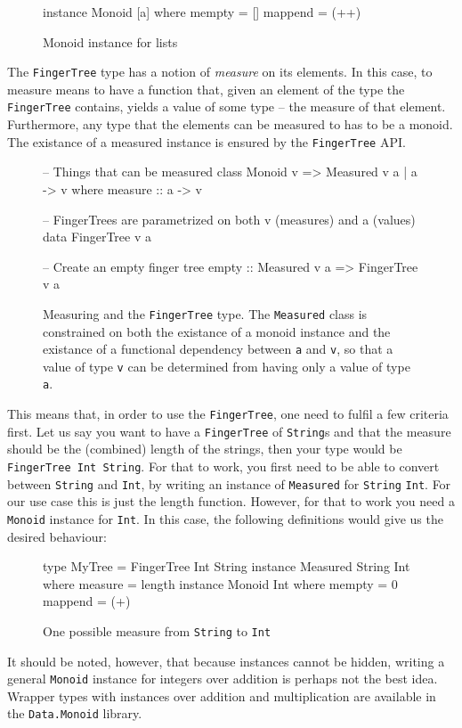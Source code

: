 \documentclass[a4paper,12pt,twosided]{report}
\begin{document}
\begin{figure}[H]
\begin{code}
instance Monoid [a] where
    mempty = []
    mappend = (++)
\end{code}
\caption{Monoid instance for lists}
\end{figure}

The \texttt{FingerTree} type has a notion of \textit{measure} on its elements.
In this case, to measure means to have a function that, given an element of the
type the \texttt{FingerTree} contains, yields a value of some type -- the
measure of that element. Furthermore, any type that the elements can be measured
to has to be a monoid. The existance of a measured instance is ensured by the
\texttt{FingerTree} API. 

\begin{figure}[H]
\begin{code}
-- Things that can be measured
class Monoid v => Measured v a | a -> v where
    measure :: a -> v

-- FingerTrees are parametrized on both v (measures) and a (values)
data FingerTree v a

-- Create an empty finger tree
empty :: Measured v a => FingerTree v a
\end{code}
\caption{Measuring and the \texttt{FingerTree} type. The \texttt{Measured} class
is constrained on both the existance of a monoid instance and the existance of a
functional dependency between \texttt{a} and \texttt{v}, so that a value of type
\texttt{v} can be determined from having only a value of type \texttt{a}.}
\end{figure}

This means that, in order to use the \texttt{FingerTree}, one need to fulfil a
few criteria first. Let us say you want to have a \texttt{FingerTree} of
\texttt{String}s and that the measure should be the (combined) length of the
strings, then your type would be \texttt{FingerTree Int String}. For that to
work, you first need to be able to convert between \texttt{String} and
\texttt{Int}, by writing an instance of \texttt{Measured} for \texttt{String}
\texttt{Int}. For our use case this is just the length function. However, for that to
work you need a \texttt{Monoid} instance for \texttt{Int}. In this case, the
following definitions would give us the desired behaviour:

\begin{figure}[H]
\begin{code}
type MyTree = FingerTree Int String
instance Measured String Int where
    measure = length
instance Monoid Int where
    mempty = 0
    mappend = (+)
\end{code}
\caption{One possible measure from \texttt{String} to \texttt{Int}}
\end{figure}
It should be noted, however, that because instances cannot be hidden, writing a
general \texttt{Monoid} instance for integers over addition is perhaps not the
best idea. Wrapper types with instances over addition and multiplication are
available in the \texttt{Data.Monoid} library. 
\end{document}

